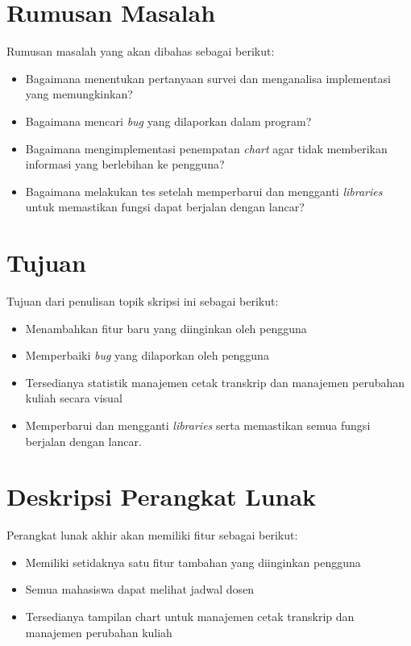 \documentclass[a4paper,twoside]{article}
\begin{document}
\section{Rumusan Masalah}
Rumusan masalah yang akan dibahas sebagai berikut:
\begin{itemize}
	\item Bagaimana menentukan pertanyaan survei dan menganalisa implementasi yang memungkinkan?
	\item Bagaimana mencari \textit{bug} yang dilaporkan dalam program? 
	\item Bagaimana mengimplementasi penempatan \textit{chart} agar tidak memberikan informasi yang berlebihan ke pengguna?
	\item Bagaimana melakukan tes setelah memperbarui dan mengganti \textit{libraries} untuk memastikan fungsi dapat berjalan dengan lancar?

\end{itemize}

\section{Tujuan}
Tujuan dari penulisan topik skripsi ini sebagai berikut:
\begin{itemize}
	\item Menambahkan fitur baru yang diinginkan oleh pengguna
	\item Memperbaiki \textit{bug} yang dilaporkan oleh pengguna
	\item Tersedianya statistik manajemen cetak transkrip dan manajemen perubahan kuliah secara visual
	\item Memperbarui dan mengganti \textit{libraries} serta memastikan semua fungsi berjalan dengan lancar.
\end{itemize}

\section{Deskripsi Perangkat Lunak}

Perangkat lunak akhir akan memiliki fitur sebagai berikut:
\begin{itemize}
	\item Memiliki setidaknya satu fitur tambahan yang diinginkan pengguna
	\item Semua mahasiswa dapat melihat jadwal dosen
	\item Tersedianya tampilan chart untuk manajemen cetak transkrip dan manajemen perubahan kuliah
	
\end{itemize}
\end{document}
